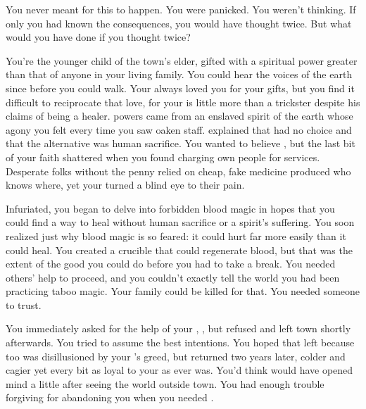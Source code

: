 \documentclass[char]{Pestilence}
\begin{document}
\name{\cRebel{}}

You never meant for this to happen. You were panicked. You weren't thinking. If only you had known the consequences, you would have thought twice. But what would you have done if you thought twice?

You're the younger child of the town's elder, gifted with a spiritual power greater than that of anyone in your living family. You could hear the voices of the earth since before you could walk. Your \cElder{\parent} always loved you for your gifts, but you find it difficult to reciprocate that love, for your \cElder{\parent} is little more than a trickster despite his claims of being a healer. \cElder{\Their} powers came from an enslaved spirit of the earth whose agony you felt every time you saw \cElder{\their} oaken staff. \cElder{\They} explained that \cElder{\they} had no choice and that the alternative was human sacrifice. You wanted to believe \cElder{\them}, but the last bit of your faith shattered when you found \cElder{\them} charging \cElder{\their} own people for \cElder{\their} services. Desperate folks without the penny relied on cheap, fake medicine produced who knows where, yet your \cElder{\parent} turned a blind eye to their pain. 

Infuriated, you began to delve into forbidden blood magic in hopes that you could find a way to heal without human sacrifice or a spirit's suffering. You soon realized just why blood magic is so feared: it could hurt far more easily than it could heal. You created a crucible that could regenerate blood, but that was the extent of the good you could do before you had to take a break. You needed others' help to proceed, and you couldn't exactly tell the world you had been practicing taboo magic. Your family could be killed for that. You needed someone to trust.  

You immediately asked for the help of your \cApprentice{\sibling}, \cApprentice{}, but \cApprentice{\they} refused and left town shortly afterwards. You tried to assume the best intentions. You hoped that \cApprentice{} left because \cApprentice{\they} too was disillusioned by your \cElder{\parent}'s greed, but \cApprentice{\they} returned two years later, colder and cagier yet every bit as loyal to your \cElder{\parent} as \cApprentice{\they} ever was. You'd think \cApprentice{} would have opened \cApprentice{\their} mind a little after seeing the world outside town. You had enough trouble forgiving \cApprentice{\them} for abandoning you when you needed \cApprentice{\them}. 
\end{document}
